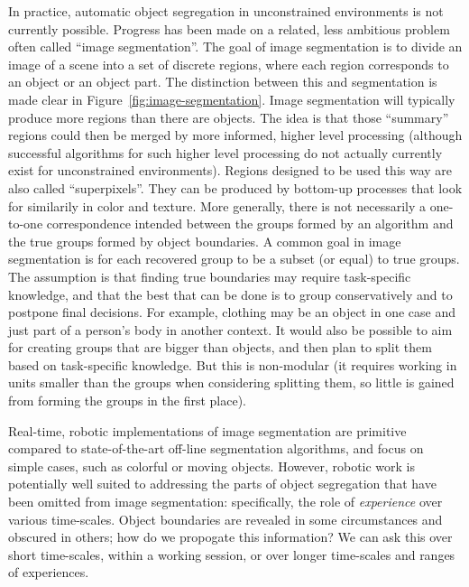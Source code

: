 

In practice, automatic object segregation
in unconstrained environments is not currently possible.
%
Progress has been made on a related, less ambitious problem
often called ``image segmentation''.  The goal of image segmentation
is to divide an image of a scene into a set of discrete
regions, where each region corresponds to an object or 
an object part.  The distinction between this and 
segmentation is made clear in Figure~\ref{fig:image-segmentation}.
%
Image segmentation will typically produce more regions than there are
objects.  The idea is that those ``summary'' regions could then be
merged by more informed, higher level processing (although successful
algorithms for such higher level processing do not actually currently
exist for unconstrained environments).  Regions designed to be
used this way are also called ``superpixels''.
%
They can be produced by bottom-up processes that look for 
similarily in color and texture.  
%
%
More generally, there is not necessarily a one-to-one
correspondence intended
 between the groups
formed by an algorithm and the true groups formed by object boundaries.
A common
goal in image segmentation is for each recovered group to be a subset (or equal) to
true groups.  The assumption is that finding true boundaries may
require task-specific knowledge, and that the best that can be done is
to group conservatively and to postpone final decisions.  
%
For example, clothing may be an object in
one case and just part of a person's body in another context.
%
It would also be possible to
aim for creating groups that are bigger than objects, and then
plan to split them based on task-specific knowledge.
But this is  non-modular 
(it requires working in units smaller than the groups when considering 
splitting them, so little is gained from forming the groups in
the first place).

%
Real-time, robotic
implementations of image segmentation are primitive compared to
state-of-the-art off-line segmentation algorithms, and focus on simple
cases, such as colorful or moving objects.
%
However, robotic work is potentially well suited to addressing the
parts of object segregation that have been omitted from image
segmentation: specifically, the role of {\em experience} over
various time-scales.  Object boundaries are revealed in some
circumstances and obscured in others; how do we propogate this
information?  We can ask this over short time-scales, within
a working session, or over longer time-scales and ranges
of experiences.

